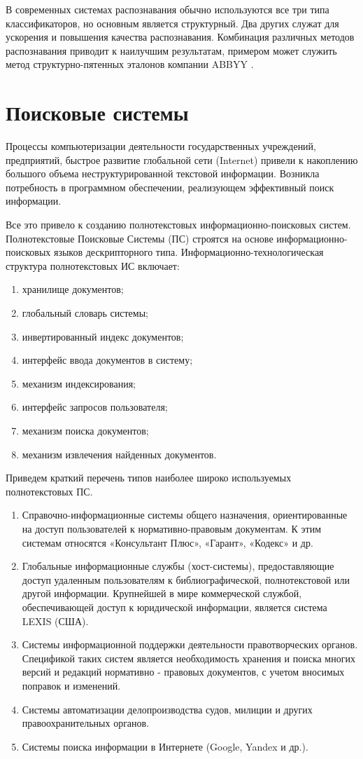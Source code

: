 \begin{table}[]
\end{table}

В современных системах распознавания обычно используются все три типа
классификаторов, но основным является структурный. Два других служат для
ускорения и повышения качества распознавания. Комбинация различных методов
распознавания приводит к наилучшим результатам, примером может служить метод
структурно-пятенных эталонов компании ABBYY \cite{telkov}.


\section{Поисковые системы}
Процессы компьютеризации деятельности государственных учреждений, предприятий, быстрое развитие глобальной сети (Internet) привели к накоплению большого объема неструктурированной текстовой информации. Возникла потребность в программном обеспечении, реализующем эффективный поиск информации.

Все это привело к созданию полнотекстовых информационно-поисковых систем. Полнотекстовые Поисковые Системы (ПС)  строятся на основе информационно-поисковых языков дескрипторного типа. Информационно-технологическая структура полнотекстовых ИС включает:
\begin{enumerate}
	\item хранилище документов; 
	\item глобальный словарь системы; 
	\item инвертированный индекс документов; 
	\item интерфейс ввода документов в систему; 
	\item механизм индексирования; 
	\item интерфейс запросов пользователя; 
	\item механизм поиска документов; 
	\item механизм извлечения найденных документов.
\end{enumerate} 

Приведем краткий перечень типов наиболее широко используемых полнотекстовых ПС.
\begin{enumerate}
\item Справочно-информационные системы общего назначения, ориентированные на доступ пользователей к нормативно-правовым документам. К этим системам относятся «Консультант Плюс», «Гарант», «Кодекс» и др. 
\item Глобальные информационные службы (хост-системы), предоставляющие доступ удаленным пользователям к библиографической, полнотекстовой или другой информации. Крупнейшей в мире коммерческой службой, обеспечивающей доступ к юридической информации, является система LEXIS (США). 
\item Системы информационной поддержки деятельности правотворческих органов. Спецификой таких систем является необходимость хранения и поиска многих версий и редакций нормативно - правовых документов, с учетом вносимых поправок и изменений. 
\item Системы автоматизации делопроизводства судов, милиции и других правоохранительных органов.
\item Системы поиска информации в Интернете (Google, Yandex и др.).
\end{enumerate}

